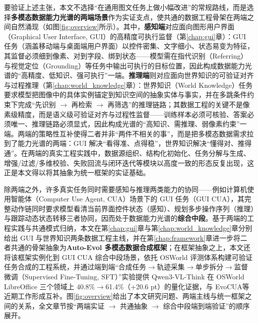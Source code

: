 要验证上述主张，本文不选择“在通用图文任务上做小幅改进”的常规路线，而是选择\textbf{多模态数据能力光谱的两端场景}作为实证支点，使共通的数据工程骨架在两端之间自然涌现（如图\ref{fig:overview}所示）。其中，\textbf{感知端}对应面向图形用户界面（Graphical User Interface, GUI）的高精度可执行监督（第\ref{chap:gui}章）：GUI 任务（涵盖移动端与桌面端用户界面）以控件密集、文字细小、状态易变为特征\citep{deka2017rico,gao2024mobileviews,liu2024seeclick}，其监督必须细到像素、对到字段、绑到状态——模型需在指代识别（Referring）与视觉定位（Grounding）等任务中输出可执行的目标位置，因此构成数据能力光谱的“高精度、低知识、强可执行”一端\citep{li2022clay,du2020ppocr,guicourse2024,liu2025uie2isynth,guiworld2024}。\textbf{推理端}则对应面向世界知识的可验证对齐与过程推理（第\ref{chap:world_knowledge}章）：世界知识（World Knowledge）任务要求模型把图像中的具体实例锚定到知识空间的抽象实体与事实\citep{marino2019okvqa,schwenk2022aokvqa,chen2023infoseek}，并在多跳条件约束下完成“先识别 $\rightarrow$ 再检索 $\rightarrow$ 再筛选”的推理链路\citep{chang2022webqa,lewis2020rag,yao2023react}；其数据工程的关键不是像素级精度，而是语义级可验证对齐与过程性监督——训练样本必须可核验、答案必须唯一、推理链路必须显式\citep{li2023pope,wei2024simpleqa,wei2022chain,zhang2023multimodalcot}，因此构成光谱的“高知识、需推理、弱像素约束”一端。两端的策略性互补使得二者并非“两件不相关的事”，而是把多模态数据需求拉到了能力光谱的两端：GUI 解决“看得准、点得稳”，世界知识解决“懂得对、推得通”。在两端的真实工程实践中，数据源组织、结构化初始化、任务分解与生成、增强/过滤/多维校验、失败回流与闭环迭代等模块以高度一致的形态反复出现，这正是本文得以将其抽象为统一框架的实证基础。

除两端之外，许多真实任务同时需要感知与推理两类能力的协同——例如计算机使用智能体（Computer Use Agent, CUA）场景下的 GUI 任务（GUI CUA），其完整动作链同时要求模型看清当前界面控件状态（感知）、规划多步操作序列（推理）与跟踪动态状态转移三者协同，因而处于数据能力光谱的\textbf{综合中段}。基于两端的工程实践与共通模式归纳，本文在第\ref{chap:gui}章与第\ref{chap:world_knowledge}章分别给出 GUI 与世界知识两条数据工程主线，并在第\ref{chap:framework}章进一步将二者共通的骨架抽象为\textbf{Auto-Evol 多模态数据合成框架}；在框架抽象之上，本文还将该框架实例化到 GUI CUA 综合中段场景，依托 OSWorld 评测体系\citep{xie2024osworld}构建可验证任务合成的工程系统，并通过端到端“合成任务$\rightarrow$轨迹采集$\rightarrow$单步拆分$\rightarrow$监督微调（Supervised Fine-Tuning, SFT）”实验提供 Qwen3-VL-Think 在 OSWorld LibreOffice 三个领域上 40.8\%$\rightarrow$61.4\%（+20.6 pt）的量化证据，与 EvoCUA\citep{xue2026evocua}等近期工作形成互补。图\ref{fig:overview}给出了本文研究问题、两端主线与统一框架之间的关系，全文章节按“两端实证 $\rightarrow$ 共通抽象 $\rightarrow$ 综合中段端到端验证”的顺序展开。

